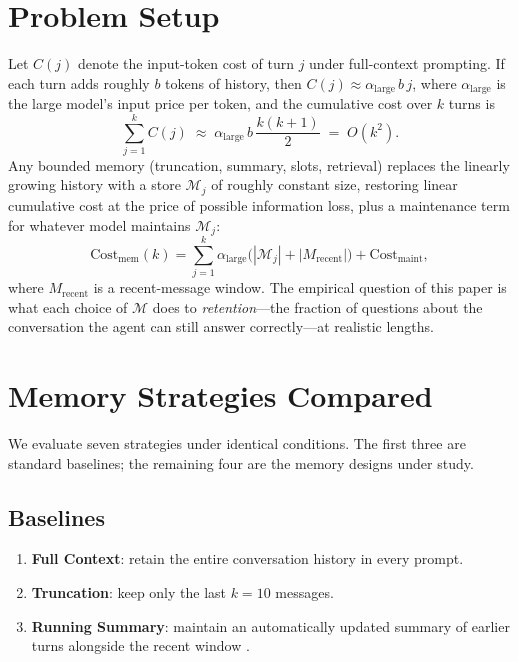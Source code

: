 \documentclass[conference]{IEEEtran}
\begin{document}
\section{Problem Setup}
\label{sec:problem}

Let $C(j)$ denote the input-token cost of turn $j$ under full-context prompting. If each turn adds roughly $b$ tokens of history, then $C(j) \approx \alpha_{\text{large}}\, b\, j$, where $\alpha_{\text{large}}$ is the large model's input price per token, and the cumulative cost over $k$ turns is
\begin{equation}
\sum_{j=1}^{k} C(j) \;\approx\; \alpha_{\text{large}}\, b\, \frac{k(k+1)}{2} \;=\; O(k^2).
\end{equation}
Any bounded memory (truncation, summary, slots, retrieval) replaces the linearly growing history with a store $\mathcal{M}_j$ of roughly constant size, restoring linear cumulative cost at the price of possible information loss, plus a maintenance term for whatever model maintains $\mathcal{M}_j$:
\begin{equation}
\text{Cost}_{\text{mem}}(k) = \sum_{j=1}^{k} \alpha_{\text{large}}\bigl(|\mathcal{M}_j| + |M_{\text{recent}}|\bigr) + \text{Cost}_{\text{maint}},
\end{equation}
where $M_{\text{recent}}$ is a recent-message window. The empirical question of this paper is what each choice of $\mathcal{M}$ does to \emph{retention}---the fraction of questions about the conversation the agent can still answer correctly---at realistic lengths.

\section{Memory Strategies Compared}
\label{sec:method}

We evaluate seven strategies under identical conditions. The first three are standard baselines; the remaining four are the memory designs under study.

\subsection{Baselines}
\begin{enumerate}
    \item \textbf{Full Context}: retain the entire conversation history in every prompt.
    \item \textbf{Truncation}: keep only the last $k{=}10$ messages.
    \item \textbf{Running Summary}: maintain an automatically updated summary of earlier turns alongside the recent window \cite{acl2024}.
\end{enumerate}
\end{document}
